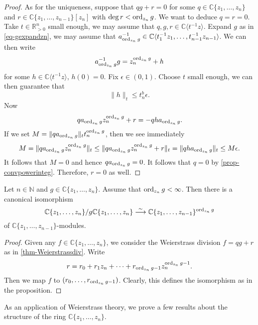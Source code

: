 \begin{proof}
    As for the uniqueness, suppose that $qg+r=0$ for some $q\in \mathbb{C}\{ z_1,\ldots,z_n\}$ and $r\in \mathbb{C}\{ z_1,\ldots,z_{n-1}\}[z_n]$ with $\deg r<\operatorname{ord}_{z_n}g$. We want to deduce $q=r=0$. Take $t\in \mathbb{R}_{>0}^n$ small enough, we may assume that $q,g,r\in \mathbb{C}\langle t^{-1}z\rangle$. Expand $g$ as in \eqref{eq-gexpandzn}, we may assume that $a_{\operatorname{ord}_{z_n}g}^{-1}\in \mathbb{C}\langle t_1^{-1}z_1,\ldots,t_{n-1}^{-1}z_{n-1}\rangle$. We can then write
    \[
        a_{\operatorname{ord}_{z_n}g}^{-1}g=z_n^{\operatorname{ord}_{z_n}g}+h  
    \]
    for some $h\in \mathbb{C}\langle t^{-1}z\rangle$, $h(0)=0$. Fix $\epsilon\in (0,1)$.
    Choose $t$ small enough, we can then guarantee that
    \[
      \|h\|_t\leq t_n^b\epsilon. 
    \]
    Now
    \[
      q   a_{\operatorname{ord}_{z_n}g} z_n^{\operatorname{ord}_{z_n}g}+r=-q h a_{\operatorname{ord}_{z_n}g}.
    \]
    If we set $M=\|q   a_{\operatorname{ord}_{z_n}g}\|_tt_n^{\operatorname{ord}_{z_n}g}$, then we see immediately
    \[
        M =\|q   a_{\operatorname{ord}_{z_n}g} z_n^{\operatorname{ord}_{z_n}g}\|_t \leq \|q   a_{\operatorname{ord}_{z_n}g} z_n^{\operatorname{ord}_{z_n}g}+r\|_t=\|q h a_{\operatorname{ord}_{z_n}g}\|_t\leq M\epsilon.
    \]
    It follows that $M=0$ and hence $q a_{\operatorname{ord}_{z_n}g}=0$. It follows that $q=0$ by \cref{prop-convpowerinteg}. Therefore, $r=0$ as well.
\end{proof}

\begin{proposition}\label{prop-convpowerquotientbyone}
    Let $n\in \mathbb{N}$ and $g\in \mathbb{C}\{ z_1,\ldots,z_n\}$. Assume that $\operatorname{ord}_{z_n}g<\infty$. Then there is a canonical isomorphism
    \[
        \mathbb{C}\{ z_1,\ldots,z_n\}/g\mathbb{C}\{ z_1,\ldots,z_n\}\stackrel{\sim}{\longrightarrow} \mathbb{C}\{ z_1,\ldots,z_{n-1}\}^{\operatorname{ord}_{z_n}g}
    \]
    of $\mathbb{C}\{ z_1,\ldots,z_{n-1}\}$-modules.
\end{proposition}
\begin{proof}
    Given any $f\in \mathbb{C}\{ z_1,\ldots,z_n\}$, we consider the Weierstrass division $f=qg+r$ as in \cref{thm-Weierstrassdiv}. Write
    \[
        r=r_0+r_1z_n+\cdots+r_{\operatorname{ord}_{z_n}g-1}z_n^{\operatorname{ord}_{z_n}g-1}.
    \]  
    Then we map $f$ to $(r_0,\ldots,r_{\operatorname{ord}_{z_n}g-1})$. Clearly, this defines the isomorphism as in the proposition.
\end{proof}


As an application of Weierstrass theory, we prove a few results about the structure of the ring $\mathbb{C}\{ z_1,\ldots,z_n\}$.

